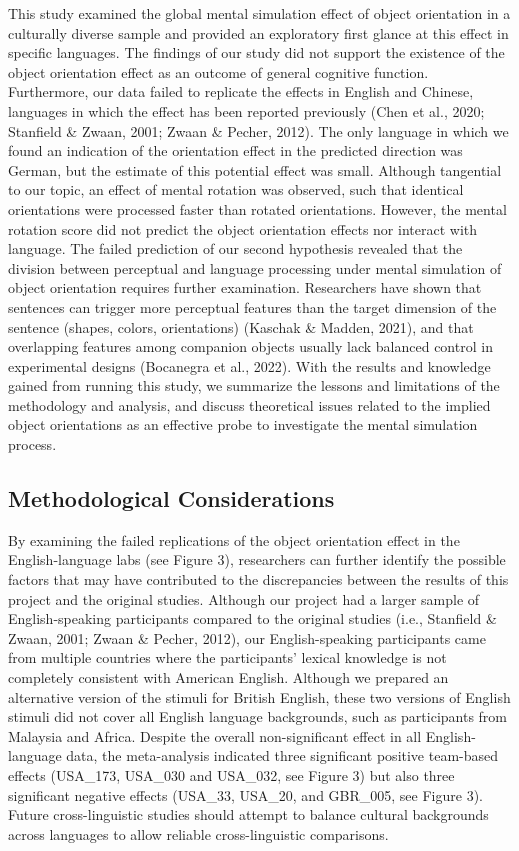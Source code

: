 \documentclass[
  man,floatsintext]{apa7}
\begin{document}
This study examined the global mental simulation effect of object
orientation in a culturally diverse sample and provided an exploratory
first glance at this effect in specific languages. The findings of our
study did not support the existence of the object orientation effect as
an outcome of general cognitive function. Furthermore, our data failed
to replicate the effects in English and Chinese, languages in which the
effect has been reported previously (Chen et al., 2020; Stanfield \& Zwaan, 2001; Zwaan \& Pecher, 2012). The only
language in which we found an indication of the orientation effect in
the predicted direction was German, but the estimate of this potential
effect was small. Although tangential to our topic, an effect of mental
rotation was observed, such that identical orientations were processed
faster than rotated orientations. However, the mental rotation score did
not predict the object orientation effects nor interact with language.
The failed prediction of our second hypothesis revealed that the
division between perceptual and language processing under mental
simulation of object orientation requires further examination.
Researchers have shown that sentences can trigger more perceptual
features than the target dimension of the sentence (shapes, colors,
orientations) (Kaschak \& Madden, 2021), and that overlapping
features among companion objects usually lack balanced control in
experimental designs (Bocanegra et al., 2022). With the results and knowledge
gained from running this study, we summarize the lessons and limitations
of the methodology and analysis, and discuss theoretical issues related
to the implied object orientations as an effective probe to investigate
the mental simulation process.

\hypertarget{methodological-considerations}{%
\subsection{Methodological Considerations}\label{methodological-considerations}}

By examining the failed replications of the object orientation effect in
the English-language labs (see Figure 3), researchers can further
identify the possible factors that may have contributed to the
discrepancies between the results of this project and the original
studies. Although our project had a larger sample of English-speaking
participants compared to the original studies (i.e., Stanfield \& Zwaan, 2001; Zwaan \& Pecher, 2012), our
English-speaking participants came from multiple countries where the
participants' lexical knowledge is not completely consistent with
American English. Although we prepared an alternative version of the
stimuli for British English, these two versions of English stimuli did
not cover all English language backgrounds, such as participants from
Malaysia and Africa. Despite the overall non-significant effect in all
English-language data, the meta-analysis indicated three significant
positive team-based effects (USA\_173, USA\_030 and USA\_032, see Figure 3)
but also three significant negative effects (USA\_33, USA\_20, and
GBR\_005, see Figure 3). Future cross-linguistic studies should attempt
to balance cultural backgrounds across languages to allow reliable
cross-linguistic comparisons.
\end{document}
